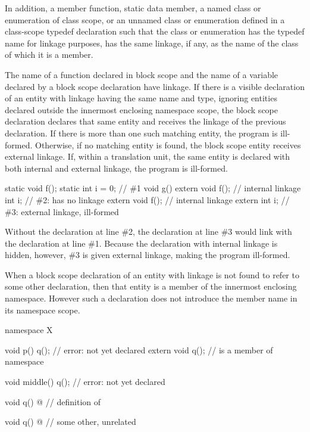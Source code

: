 \pnum
In addition, a member function, static data member, a named class or
enumeration of class scope, or an unnamed class or enumeration defined
in a class-scope typedef declaration such that the class or enumeration
has the typedef name for linkage purposes, has
the same linkage, if any, as the name of the class of which it is a
member.

\pnum
The name of a function declared in block scope and the name of a variable declared by a
block scope  declaration have linkage. If there is a visible declaration
of an entity with linkage having the same name and type, ignoring entities declared
outside the innermost enclosing namespace scope, the block scope declaration declares
that same entity and receives the linkage of the previous declaration. If there is more
than one such matching entity, the program is ill-formed. Otherwise, if no matching
entity is found, the block scope entity receives external linkage.
If, within a translation unit, the same entity is declared with both
internal and external linkage, the program is ill-formed.
\begin{example}
\begin{codeblock}
static void f();
static int i = 0;               // \#1
void g() {
  extern void f();              // internal linkage
  int i;                        // \#2:  has no linkage
  {
    extern void f();            // internal linkage
    extern int i;               // \#3: external linkage, ill-formed
  }
}
\end{codeblock}

Without the declaration at line \#2,
the declaration at line \#3 would link with the declaration at line \#1.
Because the declaration with internal linkage is hidden, however,
\#3 is given external linkage, making the program ill-formed.
\end{example}

\pnum
When a block scope declaration of an entity with linkage is not found to
refer to some other declaration, then that entity is a member of the
innermost enclosing namespace. However such a declaration does not
introduce the member name in its namespace scope. \begin{example}

\begin{codeblock}
namespace X {
  void p() {
    q();                        // error:  not yet declared
    extern void q();            //  is a member of namespace 
  }

  void middle() {
    q();                        // error:  not yet declared
  }

  void q() { @\commentellip@ }        // definition of 
}

void q() { @\commentellip@ }          // some other, unrelated 
\end{codeblock}
\end{example}

